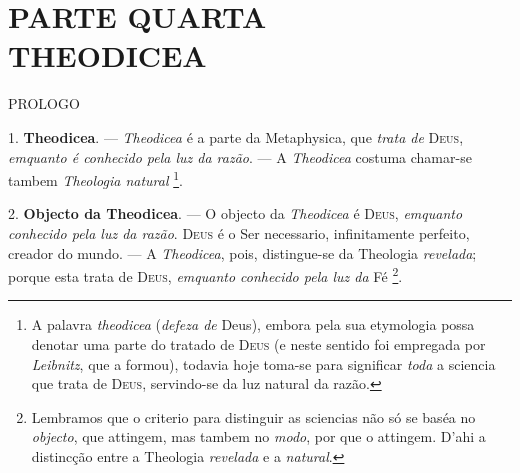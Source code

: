 

\part*{PARTE QUARTA\\[0.3em]\large THEODICEA}

 PROLOGO

1. \textbf{Theodicea}. --- \emph{Theodicea} é a parte da Metaphysica, que \emph{trata de} \textsc{Deus}, \emph{emquanto é conhecido pela luz da razão}. --- A \emph{Theodicea} costuma chamar-se tambem \emph{Theologia natural} \footnote{A palavra \emph{theodicea} (\emph{defeza de} Deus), embora pela sua etymologia possa denotar uma parte do tratado de \textsc{Deus} (e neste sentido foi empregada por \emph{Leibnitz}, que a formou), todavia hoje toma-se para significar \emph{toda} a sciencia que trata de \textsc{Deus}, servindo-se da luz natural da razão.}.

2. \textbf{Objecto da Theodicea}. --- O objecto da \emph{Theodicea} é \textsc{Deus}, \emph{emquanto conhecido pela luz da razão}. \textsc{Deus} é o Ser necessario, infinitamente perfeito, creador do mundo. --- A \emph{Theodicea}, pois, distingue-se da Theologia \emph{revelada}; porque esta trata de \textsc{Deus}, \emph{emquanto conhecido pela luz da} Fé \footnote{Lembramos que o criterio para distinguir as sciencias não só se baséa no \emph{objecto}, que attingem, mas tambem no \emph{modo}, por que o attingem. D'ahi a distincção entre a Theologia \emph{revelada} e a \emph{natural}.}.

